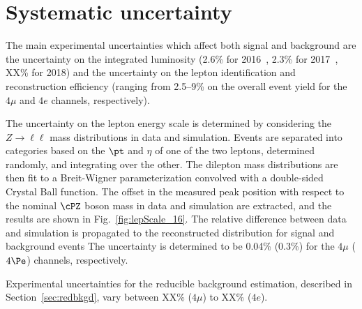 \section{Systematic uncertainty}
\label{sec:syst}

The main experimental uncertainties which affect both signal and background are the uncertainty on the integrated luminosity
(2.6\% for 2016~\cite{CMS-PAS-LUM-17-001}, 2.3\% for 2017~\cite{CMS-PAS-LUM-17-004}, XX\% for 2018) and the uncertainty on the lepton 
identification and reconstruction efficiency (ranging from 2.5--9\% on the overall event yield for the $4\mu$ 
and $4e$ channels, respectively). 

The uncertainty on the lepton energy scale is determined by considering the 
$Z\rightarrow\ell\ell$ mass distributions in data and simulation. Events are separated into categories based on the 
$\pt$ and $\eta$ of one of the two leptons, determined randomly, and integrating over the other. The dilepton mass 
distributions are then fit to a Breit-Wigner 
parameterization convolved with a double-sided Crystal Ball function. The offset in the measured peak position with 
respect to the nominal $\cPZ$ boson 
mass in data and simulation are extracted, and the results are shown in Fig.~\ref{fig:lepScale_16}. The relative difference 
between data and simulation is propagated to the reconstructed  distribution 
for signal and background events 
The uncertainty is determined to be 0.04\% (0.3\%) for the  $4\mu$ ($4\Pe$) channels, respectively. 

Experimental uncertainties for the reducible background estimation, described in Section~\ref{sec:redbkgd},
vary between XX\% ($4\mu$) to XX\% ($4e$).


